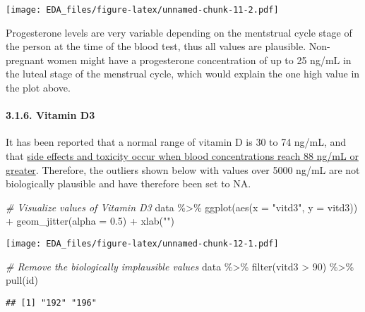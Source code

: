 \documentclass[
]{article}
\newenvironment{Shaded}{\begin{snugshade}}{\end{snugshade}}
\newcommand{\AttributeTok}[1]{\textcolor[rgb]{0.77,0.63,0.00}{#1}}
\newcommand{\CommentTok}[1]{\textcolor[rgb]{0.56,0.35,0.01}{\textit{#1}}}
\newcommand{\DecValTok}[1]{\textcolor[rgb]{0.00,0.00,0.81}{#1}}
\newcommand{\FloatTok}[1]{\textcolor[rgb]{0.00,0.00,0.81}{#1}}
\newcommand{\FunctionTok}[1]{\textcolor[rgb]{0.00,0.00,0.00}{#1}}
\newcommand{\NormalTok}[1]{#1}
\newcommand{\SpecialCharTok}[1]{\textcolor[rgb]{0.00,0.00,0.00}{#1}}
\newcommand{\StringTok}[1]{\textcolor[rgb]{0.31,0.60,0.02}{#1}}
\begin{document}
\texttt{[image: EDA\_files/figure-latex/unnamed-chunk-11-2.pdf]}

Progesterone levels are very variable depending on the mentstrual cycle
stage of the person at the time of the blood test, thus all values are
plausible. Non-pregnant women might have a progesterone concentration of
up to 25 ng/mL in the luteal stage of the menstrual cycle, which would
explain the one high value in the plot above.

\hypertarget{vitamin-d3}{%
\paragraph{3.1.6. Vitamin D3}\label{vitamin-d3}}

It has been reported that a normal range of vitamin D is 30 to 74 ng/mL,
and that
\href{https://www.uspharmacist.com/article/vitamin-d-supplementation-an-update}{side
effects and toxicity occur when blood concentrations reach 88 ng/mL or
greater}. Therefore, the outliers shown below with values over 5000
ng/mL are not biologically plausible and have therefore been set to NA.

\begin{Shaded}
\begin{Highlighting}[]
\CommentTok{\# Visualize values of Vitamin D3}
\NormalTok{data }\SpecialCharTok{\%\textgreater{}\%} 
  \FunctionTok{ggplot}\NormalTok{(}\FunctionTok{aes}\NormalTok{(}\AttributeTok{x =} \StringTok{"vitd3"}\NormalTok{, }\AttributeTok{y =}\NormalTok{ vitd3)) }\SpecialCharTok{+}
  \FunctionTok{geom\_jitter}\NormalTok{(}\AttributeTok{alpha =} \FloatTok{0.5}\NormalTok{) }\SpecialCharTok{+}
  \FunctionTok{xlab}\NormalTok{(}\StringTok{""}\NormalTok{)}
\end{Highlighting}
\end{Shaded}

\texttt{[image: EDA\_files/figure-latex/unnamed-chunk-12-1.pdf]}

\begin{Shaded}
\begin{Highlighting}[]
\CommentTok{\# Remove the biologically implausible values}
\NormalTok{data }\SpecialCharTok{\%\textgreater{}\%} 
  \FunctionTok{filter}\NormalTok{(vitd3 }\SpecialCharTok{\textgreater{}} \DecValTok{90}\NormalTok{) }\SpecialCharTok{\%\textgreater{}\%} 
  \FunctionTok{pull}\NormalTok{(id)}
\end{Highlighting}
\end{Shaded}

\begin{verbatim}
## [1] "192" "196"
\end{verbatim}
\end{document}
